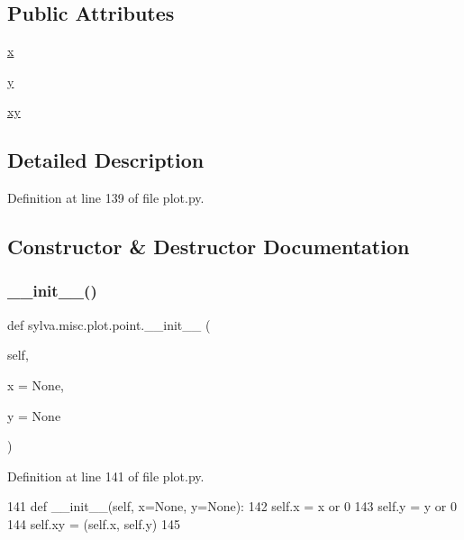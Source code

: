 \subsection*{Public Attributes}
\begin{DoxyCompactItemize}
\item 
\hyperlink{classsylva_1_1misc_1_1plot_1_1point_a268ceb8acaa96e215d84447421cbadc0}{x}
\item 
\hyperlink{classsylva_1_1misc_1_1plot_1_1point_ac2bc4268769be52f4443f74b619cd781}{y}
\item 
\hyperlink{classsylva_1_1misc_1_1plot_1_1point_a0343c9245053942c8de7e013a9c7d450}{xy}
\end{DoxyCompactItemize}


\subsection{Detailed Description}


Definition at line 139 of file plot.\+py.



\subsection{Constructor \& Destructor Documentation}
\mbox{\label{classsylva_1_1misc_1_1plot_1_1point_a081090273abbdf33a6d4817720887cae}} 
\subsubsection{\texorpdfstring{\+\_\+\+\_\+init\+\_\+\+\_\+()}{\_\_init\_\_()}}
{\footnotesize\ttfamily def sylva.\+misc.\+plot.\+point.\+\_\+\+\_\+init\+\_\+\+\_\+ (\begin{DoxyParamCaption}\item[{}]{self,  }\item[{}]{x = {\ttfamily None},  }\item[{}]{y = {\ttfamily None} }\end{DoxyParamCaption})}



Definition at line 141 of file plot.\+py.


\begin{DoxyCode}
141         \textcolor{keyword}{def }\_\_init\_\_(self, x=None, y=None):
142             self.x = x \textcolor{keywordflow}{or} 0
143             self.y = y \textcolor{keywordflow}{or} 0
144             self.xy = (self.x, self.y)
145 
\end{DoxyCode}



